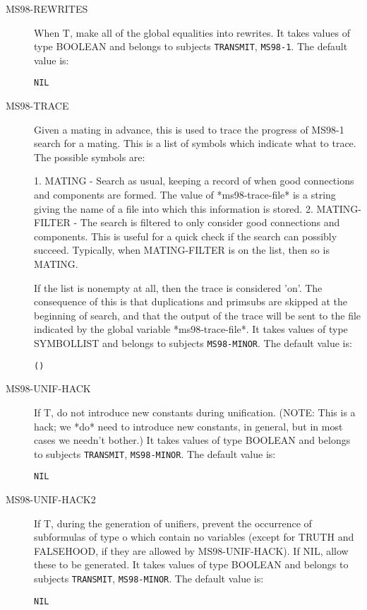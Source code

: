 \begin{description}
\item[MS98-REWRITES]  
When T, make all of the global equalities into rewrites.
It takes values of type BOOLEAN and belongs to subjects \texttt{TRANSMIT}, \texttt{MS98-1}.  The default value is: \begin{lstlisting}
NIL
\end{lstlisting}

\item[MS98-TRACE]  
Given a mating in advance, this is used to trace the progress 
of MS98-1 search for a mating.  This is a list of symbols which
indicate what to trace.  The possible symbols are:

1. MATING - Search as usual, keeping a record of when good connections and
components are formed.  The value of *ms98-trace-file* is a string giving the
name of a file into which this information is stored.
2. MATING-FILTER - The search is filtered to only consider good
connections and components.  This is useful for a quick check
if the search can possibly succeed.  Typically, when MATING-FILTER
is on the list, then so is MATING.

If the list is nonempty at all, then the trace is considered 'on'.
The consequence of this is that duplications and primsubs are
skipped at the beginning of search, and that the output of the
trace will be sent to the file indicated by the global variable
*ms98-trace-file*.
It takes values of type SYMBOLLIST and belongs to subjects \texttt{MS98-MINOR}.  The default value is: \begin{lstlisting}
()
\end{lstlisting}

\item[MS98-UNIF-HACK]  
If T, do not introduce new constants during unification.
(NOTE: This is a hack; we *do* need to introduce new constants, in 
general, but in most cases we needn't bother.)
It takes values of type BOOLEAN and belongs to subjects \texttt{TRANSMIT}, \texttt{MS98-MINOR}.  The default value is: \begin{lstlisting}
NIL
\end{lstlisting}

\item[MS98-UNIF-HACK2]  
If T, during the generation of unifiers, prevent the 
occurrence of subformulas of type o which contain no variables
(except for TRUTH and FALSEHOOD, if they are allowed by MS98-UNIF-HACK).
If NIL, allow these to be generated.
It takes values of type BOOLEAN and belongs to subjects \texttt{TRANSMIT}, \texttt{MS98-MINOR}.  The default value is: \begin{lstlisting}
NIL
\end{lstlisting}


\end{description}
